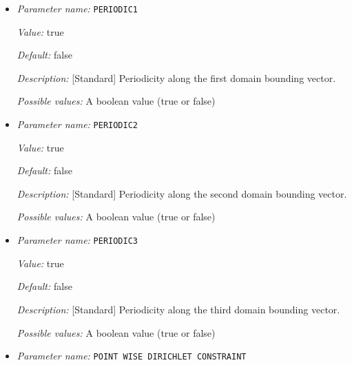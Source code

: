 \begin{itemize}
{\it Value:} false


{\it Default:} false


{\it Description:} [Standard] Flag to set point wise multipole boundary conditions (upto quadrupole term) for non-periodic systems.


{\it Possible values:} A boolean value (true or false)
\item {\it Parameter name:} {\tt PERIODIC1}
\label{parameters:Boundary conditions/PERIODIC1}
\label{parameters:Boundary_20conditions/PERIODIC1}


{\it Value:} true


{\it Default:} false


{\it Description:} [Standard] Periodicity along the first domain bounding vector.


{\it Possible values:} A boolean value (true or false)
\item {\it Parameter name:} {\tt PERIODIC2}
\label{parameters:Boundary conditions/PERIODIC2}
\label{parameters:Boundary_20conditions/PERIODIC2}


{\it Value:} true


{\it Default:} false


{\it Description:} [Standard] Periodicity along the second domain bounding vector.


{\it Possible values:} A boolean value (true or false)
\item {\it Parameter name:} {\tt PERIODIC3}
\label{parameters:Boundary conditions/PERIODIC3}
\label{parameters:Boundary_20conditions/PERIODIC3}


{\it Value:} true


{\it Default:} false


{\it Description:} [Standard] Periodicity along the third domain bounding vector.


{\it Possible values:} A boolean value (true or false)
\item {\it Parameter name:} {\tt POINT WISE DIRICHLET CONSTRAINT}
\label{parameters:Boundary conditions/POINT WISE DIRICHLET CONSTRAINT}
\label{parameters:Boundary_20conditions/POINT_20WISE_20DIRICHLET_20CONSTRAINT}



\end{itemize}
